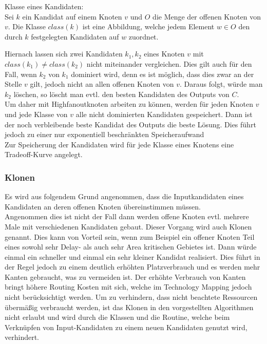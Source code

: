 \documentclass[11pt, a4paper, german]{article}
\newcommand{\TM}{Technology  Mapping }
\begin{document}
\begin{definition}{Klasse eines Kandidaten:}\\
	Sei $k$ ein Kandidat auf einem Knoten $v$ und $O$ die Menge der offenen Knoten von $v$. Die Klasse $class(k)$ ist eine Abbildung, welche jedem Element $w \in O$ den durch $k$ festgelegten Kandidaten auf $w$ zuordnet.\\
\end{definition}
Hiernach lassen sich zwei Kandidaten $k_1,k_2$ eines Knoten $v$ mit $class(k_1) \neq class(k_2)$ nicht miteinander vergleichen. Dies gilt auch für den Fall, wenn $k_2$ von  $k_1$ dominiert wird, denn es ist möglich, dass dies zwar an der Stelle $v$ gilt, jedoch nicht an allen offenen Knoten von $v$. Daraus folgt, würde man $k_2$ löschen, so löscht man evtl. den besten Kandidaten des Outputs von $C$. \\
Um daher mit Highfanoutknoten arbeiten zu können, werden für jeden Knoten $v$ und jede Klasse von $v$ alle nicht dominierten Kandidaten gespeichert. Dann ist der noch verbleibende beste Kandidat des Outputs die beste Lösung. Dies führt jedoch zu einer nur exponentiell beschränkten Speicheraufwand\\
Zur Speicherung der Kandidaten wird für jede Klasse eines Knotens eine Tradeoff-Kurve angelegt.

\subsubsection{Klonen}

Es wird aus folgendem Grund angenommen, dass die Inputkandidaten eines Kandidaten an deren offenen Knoten übereinstimmen müssen.\\
Angenommen dies ist nicht der Fall dann werden offene Knoten evtl. mehrere Male mit verschiedenen Kandidaten gebaut. Dieser Vorgang wird auch Klonen genannt. Dies kann von Vorteil sein, wenn zum Beispiel ein offener Knoten Teil eines sowohl sehr Delay- als auch sehr Area kritischen Gebietes ist. Dann würde einmal ein schneller und einmal ein sehr kleiner Kandidat realisiert. Dies führt in der Regel jedoch zu einem deutlich erhöhten Platzverbrauch und es werden mehr Kanten gebraucht, was zu vermeiden ist. Der erhöhte Verbrauch von Kanten bringt höhere Routing Kosten mit sich, welche im \TM jedoch nicht berücksichtigt werden. Um zu verhindern, dass nicht beachtete Ressourcen übermäßig verbraucht werden, ist das Klonen in den vorgestellten Algorithmen nicht erlaubt und wird durch die Klassen und die Routine, welche beim Verknüpfen von Input-Kandidaten zu einem neuen Kandidaten genutzt wird, verhindert. 
\end{document}
